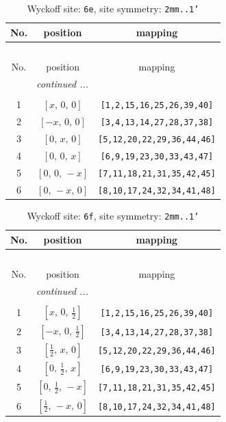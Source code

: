 \documentclass[fleqn,8pt]{jsarticle}
\begin{document}
\renewcommand{\arraystretch}{1.2}
\begin{longtable}{ccc}
\caption{Wyckoff site: {\tt 6e}, site symmetry: {\tt 2mm..1'}}
 \\
 \hline \hline
No. & position & mapping \\ \hline \endfirsthead

\multicolumn{2}{l}{\tablename\ \thetable{}} \\
 \hline \hline
No. & position & mapping \\ \hline \endhead

 \hline \hline
\multicolumn{2}{r}{\footnotesize\it continued ...} \\ \endfoot

 \hline \hline
\multicolumn{2}{r}{} \\ \endlastfoot

1 & $\left[ x,\, 0,\, 0 \right]$ & {\tt [1,2,15,16,25,26,39,40]} \\ \hline
2 & $\left[ - x,\, 0,\, 0 \right]$ & {\tt [3,4,13,14,27,28,37,38]} \\ \hline
3 & $\left[ 0,\, x,\, 0 \right]$ & {\tt [5,12,20,22,29,36,44,46]} \\ \hline
4 & $\left[ 0,\, 0,\, x \right]$ & {\tt [6,9,19,23,30,33,43,47]} \\ \hline
5 & $\left[ 0,\, 0,\, - x \right]$ & {\tt [7,11,18,21,31,35,42,45]} \\ \hline
6 & $\left[ 0,\, - x,\, 0 \right]$ & {\tt [8,10,17,24,32,34,41,48]} \\
\end{longtable}
\renewcommand{\arraystretch}{1.2}
\begin{longtable}{ccc}
\caption{Wyckoff site: {\tt 6f}, site symmetry: {\tt 2mm..1'}}
 \\
 \hline \hline
No. & position & mapping \\ \hline \endfirsthead

\multicolumn{2}{l}{\tablename\ \thetable{}} \\
 \hline \hline
No. & position & mapping \\ \hline \endhead

 \hline \hline
\multicolumn{2}{r}{\footnotesize\it continued ...} \\ \endfoot

 \hline \hline
\multicolumn{2}{r}{} \\ \endlastfoot

1 & $\left[ x,\, 0,\, \frac{1}{2} \right]$ & {\tt [1,2,15,16,25,26,39,40]} \\ \hline
2 & $\left[ - x,\, 0,\, \frac{1}{2} \right]$ & {\tt [3,4,13,14,27,28,37,38]} \\ \hline
3 & $\left[ \frac{1}{2},\, x,\, 0 \right]$ & {\tt [5,12,20,22,29,36,44,46]} \\ \hline
4 & $\left[ 0,\, \frac{1}{2},\, x \right]$ & {\tt [6,9,19,23,30,33,43,47]} \\ \hline
5 & $\left[ 0,\, \frac{1}{2},\, - x \right]$ & {\tt [7,11,18,21,31,35,42,45]} \\ \hline
6 & $\left[ \frac{1}{2},\, - x,\, 0 \right]$ & {\tt [8,10,17,24,32,34,41,48]} \\
\end{longtable}
\end{document}
